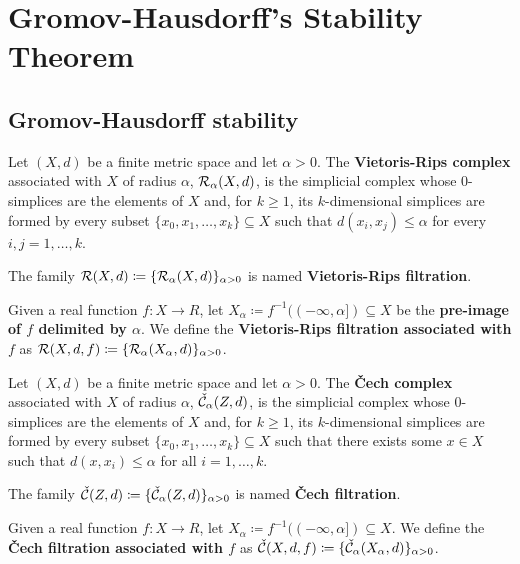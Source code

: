 \chapter{Gromov-Hausdorff's Stability Theorem} \label{chapter:gromov-hausdorf-stability}
\section{Gromov-Hausdorff stability}

\begin{definition}
    Let $ (X, d) $ be a finite metric space and let $ \alpha > 0 $. The {\bf Vietoris-Rips complex} associated with $ X $ of radius $ \alpha $, $\mathcal{R}_\alpha(X, d)$, is the simplicial complex whose $0$-simplices are the elements of $X$ and, for $k \geq 1$, its $k$-dimensional simplices are formed by every subset $ \{x_0, x_1, \dots, x_k\} \subseteq X $ such that $d(x_i, x_j) \leq \alpha $ for every $i, j = 1, \dots, k$.

    The family $ \mathcal{R}(X, d) \coloneq \{\mathcal{R}_\alpha(X, d)\}_{\alpha>0}$ is named {\bf Vietoris-Rips filtration}. 

    Given a real function $ f \colon X \to R $, let $ X_\alpha \coloneq f^{-1}((-\infty, \alpha]) \subseteq X $ be the {\bf pre-image of $f$ delimited by $ \alpha $}. We define the {\bf Vietoris-Rips filtration associated with $ f $} as $ \mathcal{R}(X, d, f) \coloneq \{\mathcal{R}_\alpha(X_\alpha, d)\}_{\alpha>0}$.

\end{definition}

\begin{definition}
    Let $ (X, d) $ be a finite metric space and let $ \alpha > 0 $. The {\bf Čech complex} associated with $ X $ of radius $ \alpha $, $\check{\mathcal{C}}_\alpha(Z, d)$, is the simplicial complex whose $0$-simplices are the elements of $X$ and, for $k \geq 1$, its $k$-dimensional simplices are formed by every subset $ \{x_0, x_1, \dots, x_k\} \subseteq X $ such that there exists some $ x \in X $ such that $ d(x, x_i) \leq \alpha $ for all $i = 1, \dots, k$.

    The family $\check{\mathcal{C}}(Z, d) \coloneq \{\check{\mathcal{C}}_\alpha(Z, d)\}_{\alpha > 0}$ is named {\bf Čech filtration}.

    Given a real function $ f \colon X \to R $, let $ X_\alpha \coloneq f^{-1}((-\infty, \alpha]) \subseteq X $. We define the {\bf Čech filtration associated with $ f $} as $ \check{\mathcal{C}}(X, d, f) \coloneq \{\check{\mathcal{C}}_\alpha(X_\alpha, d)\}_{\alpha>0}$.
\end{definition}

